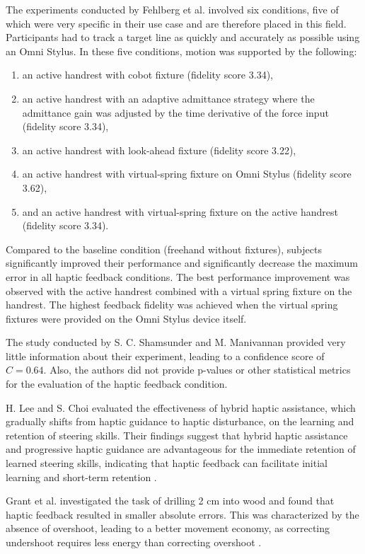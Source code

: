 The experiments conducted by Fehlberg et al. involved six conditions, five of which were very specific in their use case and are therefore placed in this field. Participants had to track a target line as quickly and accurately as possible using an Omni Stylus. In these five conditions, motion was supported by the following:
\begin{enumerate}
    \item an active handrest with cobot fixture (fidelity score 3.34),
    \item an active handrest with an adaptive admittance strategy where the admittance gain was adjusted by the time derivative of the force input (fidelity score 3.34),
    \item an active handrest with look-ahead fixture (fidelity score 3.22),
    \item an active handrest with virtual-spring fixture on Omni Stylus (fidelity score 3.62),
    \item and an active handrest with virtual-spring fixture on the active handrest (fidelity score 3.34).
\end{enumerate}
Compared to the baseline condition (freehand without fixtures), subjects significantly improved their performance and significantly decrease the maximum error in all haptic feedback conditions. The best performance improvement was observed with the active handrest combined with a virtual spring fixture on the handrest. The highest feedback fidelity was achieved when the virtual spring fixtures were provided on the Omni Stylus device itself. 

The study conducted by S. C. Shamsunder and M. Manivannan provided very little information about their experiment, leading to a confidence score of $C = 0.64$. Also, the authors did not provide p-values or other statistical metrics for the evaluation of the haptic feedback condition.

H. Lee and S. Choi evaluated the effectiveness of hybrid haptic assistance, which gradually shifts from haptic guidance to haptic disturbance, on the learning and retention of steering skills. Their findings suggest that hybrid haptic assistance and progressive haptic guidance are advantageous for the immediate retention of learned steering skills, indicating that haptic feedback can facilitate initial learning and short-term retention \cite{LeeH2014}. 

Grant et al. \cite{Grant2019} investigated the task of drilling 2 cm into wood and found that haptic feedback resulted in smaller absolute errors. This was characterized by the absence of overshoot, leading to a better movement economy, as correcting undershoot requires less energy than correcting overshoot \cite{Grant2019}.


